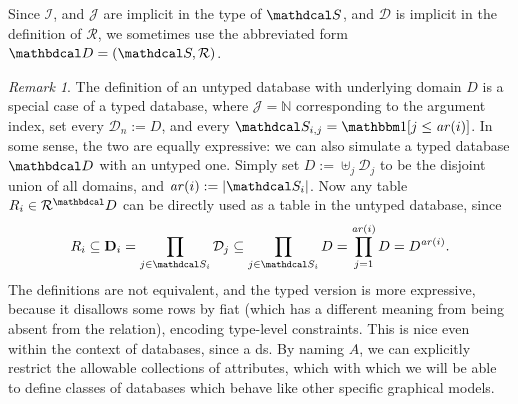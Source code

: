 \documentclass{article}
\theoremstyle{definition}
\theoremstyle{remark}
\newtheorem*{remark}{Remark}
\newcommand\mat[1]{\mathbf{#1}}
\newcommand{\D}{\mathbdcal D}
\newcommand{\Attrs}{\mathcal J}
\newcommand{\Idx}{\mathcal I}
\newcommand{\arity}{\mathit{ar}}
\newcommand{\Doms}{{\mathcal D}}
\newcommand{\Rels}{{\mathcal R}}
\newcommand{\sch}{\mathdcal S}%
\begin{document}
\begin{defn}
	
	
	
	\smallskip	
	Since $\Idx$, and $\Attrs$ are implicit in the type of $\sch$, and $\Doms$ is implicit in the definition of $\Rels$,
	we sometimes use the abbreviated form $\D = (\sch, \Rels)$. %
\end{defn}


\begin{remark}\label{rem:typed-db-better}
    The definition of an untyped database with underlying domain $D$ is a special case of a typed database, where $\Attrs = \mathbb N$ corresponding to the argument index, set every $\Doms_n := D $, and every $\sch_{i,j} = \mathbbm1[j \le \arity(i)]$. 
    In some sense, the two are equally expressive: we can also simulate a typed database $\D$ with an untyped one. Simply set $D := \uplus_j \mathcal D_j$ to be the disjoint union of all domains, and $\arity(i) := |\sch_i|$. Now any table $R_i \in \Rels^\D$ can be directly used as a table in the untyped database, since
    \[R_i \subseteq \mat D_i = \prod_{j \in \sch_i} \mathcal D_{j} 
		\subseteq \prod_{j \in \sch_i} D = \prod_{j = 1}^{\arity(i)} D = 
        D^{\arity(i)} .\] 
  	The definitions are not equivalent, and the typed version is more expressive, because it disallows some rows by fiat (which has a different meaning from being absent from the relation), encoding type-level constraints. This is nice even within the context of databases, since a ds. By naming $A$, we can explicitly restrict the  allowable collections of attributes, which with which we will be able to define classes of databases which behave like other specific graphical models.
\end{remark}
\end{document}
